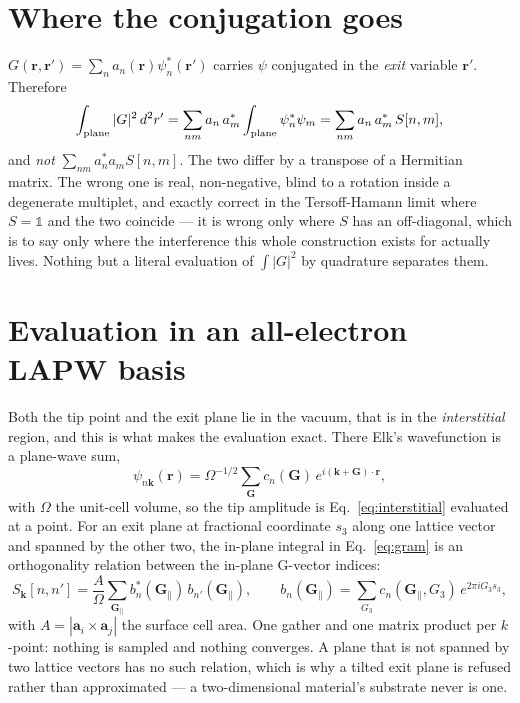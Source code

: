\documentclass[11pt]{article}
\begin{document}
\section{Where the conjugation goes}

$G(\mathbf r,\mathbf r')=\sum_n a_n(\mathbf r)\psi^*_n(\mathbf r')$ carries
$\psi$ conjugated in the \emph{exit} variable $\mathbf r'$. Therefore
\begin{equation}
  \int_{\rm plane}|G|^2\,d^2r'
  =\sum_{nm}a_n\,a^*_m\int_{\rm plane}\psi^*_n\psi_m
  =\sum_{nm}a_n\,a^*_m\,S[n,m],
\end{equation}
and \emph{not} $\sum_{nm}a^*_na_mS[n,m]$. The two differ by a transpose of a
Hermitian matrix. The wrong one is real, non-negative, blind to a rotation
inside a degenerate multiplet, and exactly correct in the Tersoff-Hamann limit
where $S=\mathbb 1$ and the two coincide --- it is wrong only where $S$ has an
off-diagonal, which is to say only where the interference this whole
construction exists for actually lives. Nothing but a literal evaluation of
$\int|G|^2$ by quadrature separates them.

\section{Evaluation in an all-electron LAPW basis}

Both the tip point and the exit plane lie in the vacuum, that is in the
\emph{interstitial} region, and this is what makes the evaluation exact. There
Elk's wavefunction is a plane-wave sum,
\begin{equation}
  \psi_{n\mathbf k}(\mathbf r)=\Omega^{-1/2}\sum_{\mathbf G}
    c_{n}(\mathbf G)\,e^{i(\mathbf k+\mathbf G)\cdot\mathbf r},
  \label{eq:interstitial}
\end{equation}
with $\Omega$ the unit-cell volume, so the tip amplitude is
Eq.~\eqref{eq:interstitial} evaluated at a point. For an exit plane at
fractional coordinate $s_3$ along one lattice vector and spanned by the other
two, the in-plane integral in Eq.~\eqref{eq:gram} is an orthogonality relation
between the in-plane G-vector indices:
\begin{equation}
  S_{\mathbf k}[n,n']=\frac{A}{\Omega}\sum_{\mathbf G_\parallel}
    b^*_n(\mathbf G_\parallel)\,b_{n'}(\mathbf G_\parallel),
  \qquad
  b_n(\mathbf G_\parallel)=\sum_{G_3}c_n(\mathbf G_\parallel,G_3)\,
    e^{2\pi iG_3s_3},
  \label{eq:collapse}
\end{equation}
with $A=|\mathbf a_i\times\mathbf a_j|$ the surface cell area. One gather and
one matrix product per $k$-point: nothing is sampled and nothing converges.
A plane that is not spanned by two lattice vectors has no such relation, which
is why a tilted exit plane is refused rather than approximated --- a
two-dimensional material's substrate never is one.
\end{document}
